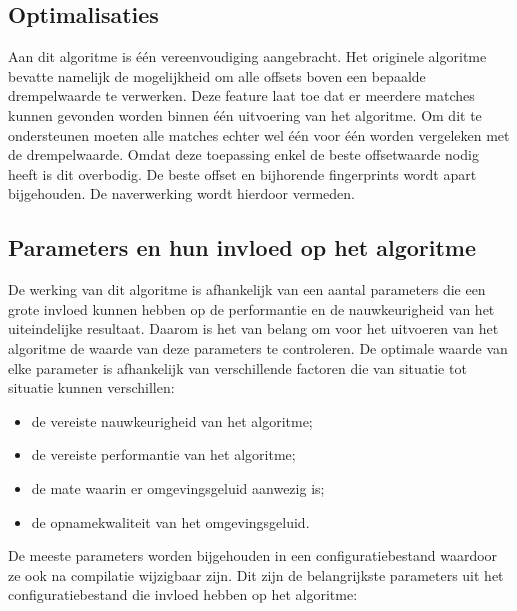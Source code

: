\subsection{Optimalisaties}

Aan dit algoritme is één vereenvoudiging aangebracht. Het originele algoritme bevatte namelijk de mogelijkheid om alle offsets boven een bepaalde drempelwaarde te verwerken. Deze feature laat toe dat er meerdere matches kunnen gevonden worden binnen één uitvoering van het algoritme. Om dit te ondersteunen moeten alle matches echter wel één voor één worden vergeleken met de drempelwaarde. Omdat deze toepassing enkel de beste offsetwaarde nodig heeft is dit overbodig. De beste offset en bijhorende fingerprints wordt apart bijgehouden. De naverwerking wordt hierdoor vermeden.

\subsection{Parameters en hun invloed op het algoritme}
\label{accoustic-fingerprinting-params}

De werking van dit algoritme is afhankelijk van een aantal parameters die een grote invloed kunnen hebben op de performantie en de nauwkeurigheid van het uiteindelijke resultaat. Daarom is het van belang om voor het uitvoeren van het algoritme de waarde van deze parameters te controleren. De optimale waarde van elke parameter is afhankelijk van verschillende factoren die van situatie tot situatie kunnen verschillen:

\begin{itemize}[noitemsep]
\item de vereiste nauwkeurigheid van het algoritme;
\item de vereiste performantie van het algoritme;
\item de mate waarin er omgevingsgeluid aanwezig is;
\item de opnamekwaliteit van het omgevingsgeluid.
\end{itemize}

De meeste parameters worden bijgehouden in een configuratiebestand waardoor ze ook na compilatie wijzigbaar zijn. Dit zijn de belangrijkste parameters uit het configuratiebestand die invloed hebben op het algoritme:

